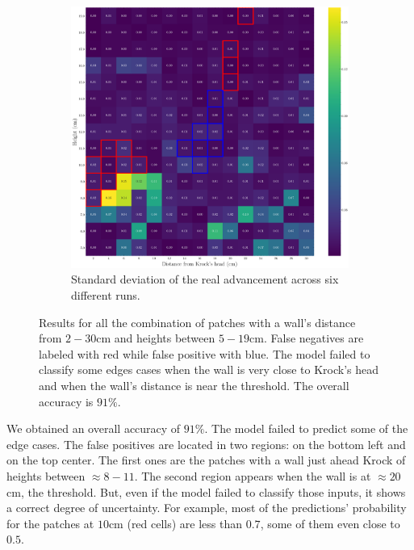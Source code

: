 \documentclass[../document.tex]{subfiles}
\begin{document}
    \begin{figure}[htbp]
        \centering
    \ContinuedFloat
    \begin{subfigure}[b]{0.66\linewidth}
        \includegraphics[width=\linewidth]{../img/5/custom_patches/walls_heights/walls_heights_std.png}
        \caption{Standard deviation of the real advancement across six different runs.}
        \label{fig : walls-heights-std}
    \end{subfigure}   
\caption{Results for all the combination of patches with a wall's distance from $2-30$cm and heights between $5 - 19$cm. False negatives are labeled with red while false positive with blue. The model failed to classify some edges cases when the wall is very close to Krock's head and when the wall's distance is near the threshold. The overall accuracy is $91\%$.}    
\label{fig : walls-heights}
\end{figure}
We obtained an overall accuracy of $91\%$. The model failed to predict some of the edge cases. The false positives are located in two regions: on the bottom left and on the top center. The first ones are the patches with a wall just ahead Krock of heights between $\approx 8 - 11$. The second region appears when the wall is at $\approx 20$cm, the threshold. But, even if the model failed to classify those inputs, it shows a correct degree of uncertainty. For example, most of the predictions' probability for the patches at $10$cm (red cells) are less than $0.7$, some of them even close to $0.5$.
\end{document}
